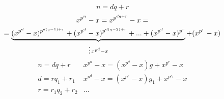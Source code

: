 \documentclass[main]{subfiles}
\begin{document}
    \begin{Proof}[леммы]
        \[n = dq + r\]
        \begin{multline*}
            x^{p^n} - x = x^{p^{dq + r} } - x = \\
            = \underbrace{(x^{p^d} - x )^{p^{d(q - 1) + r} } + (x^{p^d} - x )^{p^{d(q - 2) + r} }
            + ... + (x^{p^d} - x )^{p^r}}_{\devides x^{p^d} - x } + (x^{p^r} - x )
        \end{multline*}
        \[\begin{matrix}
            n = dq + r & x^{p^n} - x = (x^{p^d} - x )g + x^{p^r} - x  \\
            d = rq_1 + r_1 & x^{p^d} - x =  (x^{p^r} - x )g_1 + x^{p^{r_1} } - x \\
            r = r_1q_2 + r_2 & ...
        \end{matrix}\]
    \end{Proof}
\end{document}
